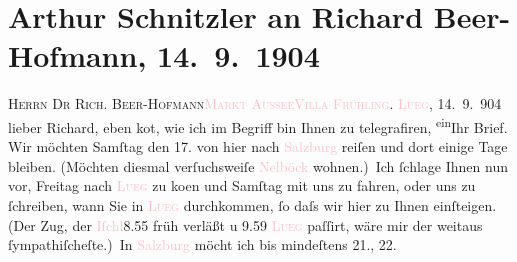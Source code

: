 

               \section[Arthur Schnitzler an Richard Beer-Hofmann, 14. 9. 1904]{ Arthur Schnitzler an Richard Beer-Hofmann, 14. 9. 1904}\nopagebreak{}\rehead{ }\normalsize\beginnumbering{} \toendnotes[C]{\smallbreak\pagebreak[2]} 
\toendnotes[C]{\smallbreak}\pstart{}{\pb}\textsc{Herrn Dr Rich. Beer-Hofmann}\pend{}\pstart{}\textsc{\textcolor{pink}{Markt Aussee}{}\ledrightnote{\textcolor{pink}{Bad Aussee}}}\pend{}\pstart{}\textcolor{pink}{\textsc{Villa Frühling}}{}\ledrightnote{\textcolor{pink}{Villa Frühling}}.
               \pend{}{\bigskip}\pstart
           \raggedleft{}{\pb}\textcolor{pink}{\textsc{Lueg}}{}\ledrightnote{\textcolor{pink}{Lueg am Wolfgangsee}}, 14. 9. 904\pend
           \pstart
           lieber Richard, eben ko{\geminationm}t, wie ich im
               Begriff bin Ihnen zu telegrafiren, \substVorne{}\textsuperscript{ein}\substDazwischen{}Ihr\substHinten{} Brief. Wir möchten Samſtag den 17. von hier nach \textcolor{pink}{Salzburg}{}\ledrightnote{\textcolor{pink}{Salzburg}} reiſen und dort einige Tage bleiben. (Möchten diesmal
               verſuchsweiſe \textcolor{pink}{Nelböck}{}\ledrightnote{\textcolor{pink}{Hotel und Pension Nelböck}} wohnen.) Ich ſchlage Ihnen
               nun vor, Freitag nach \textcolor{pink}{\textsc{Lueg}}{}\ledrightnote{\textcolor{pink}{Lueg am Wolfgangsee}} zu ko{\geminationm}en und Samſtag mit uns zu
               fahren, oder uns zu ſchreiben, wann Sie in \textcolor{pink}{\textsc{Lueg}}{}\ledrightnote{\textcolor{pink}{Lueg am Wolfgangsee}} durchkommen, ſo daſs wir hier zu Ihnen einſteigen. (Der Zug, der \textcolor{pink}{Iſchl}{}\ledrightnote{\textcolor{pink}{Bad Ischl}}{ }8.55 früh verläßt u 9.59{ }\textcolor{pink}{\textsc{Lueg}}{}\ledrightnote{\textcolor{pink}{Lueg am Wolfgangsee}} paſſirt, wäre mir der weitaus ſympathiſcheſte.) In \textcolor{pink}{Salzburg}{}\ledrightnote{\textcolor{pink}{Salzburg}} möcht ich bis mindeſtens 21., 22.

